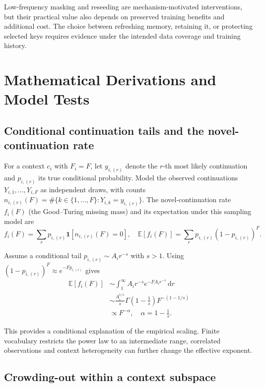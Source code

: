 Low-frequency masking and reseeding are mechanism-motivated interventions, but their practical value also depends on preserved training benefits and additional cost. The choice between refreshing memory, retaining it, or protecting selected keys requires evidence under the intended data coverage and training history.

\section{Mathematical Derivations and Model Tests}
\label{app:math}

\subsection{Conditional continuation tails and the novel-continuation rate}
For a context $c_i$ with $F_i=F$, let $y_{i,(r)}$ denote the $r$-th most likely continuation and $p_{i,(r)}$ its true conditional probability. Model the observed continuations $Y_{i,1},\ldots,Y_{i,F}$ as independent draws, with counts $n_{i,(r)}(F)=\#\{k\in\{1,\ldots,F\}:Y_{i,k}=y_{i,(r)}\}$. The novel-continuation rate $f_i(F)$ (the Good--Turing missing mass) and its expectation under this sampling model are
\begin{equation}
f_i(F)=\sum_r p_{i,(r)}
\mathbf{1}\left[n_{i,(r)}(F)=0\right],
\quad
\mathbb{E}[f_i(F)]=\sum_r p_{i,(r)}(1-p_{i,(r)})^F.
\end{equation}

Assume a conditional tail $p_{i,(r)}\sim A_i r^{-s}$ with $s>1$. Using $(1-p_{i,(r)})^F\approx e^{-Fp_{i,(r)}}$ gives
\citep{gnedin2007occupancy}
\begin{equation}
\begin{aligned}
\mathbb{E}[f_i(F)]
&\sim
\int_1^\infty A_i r^{-s}e^{-F A_i r^{-s}}\,\mathrm{d}r\\
&\sim
\frac{A_i^{1/s}}{s}
\Gamma\left(1-\frac{1}{s}\right)
F^{-(1-1/s)}\\
&\propto F^{-\alpha},
\quad
\alpha=1-\frac{1}{s}.
\end{aligned}
\label{eq:occupancy}
\end{equation}

This provides a conditional explanation of the empirical scaling. Finite vocabulary restricts the power law to an intermediate range, correlated observations and context heterogeneity can further change the effective exponent.

\subsection{Crowding-out within a context subspace}
\label{app:crowding-derivation}

